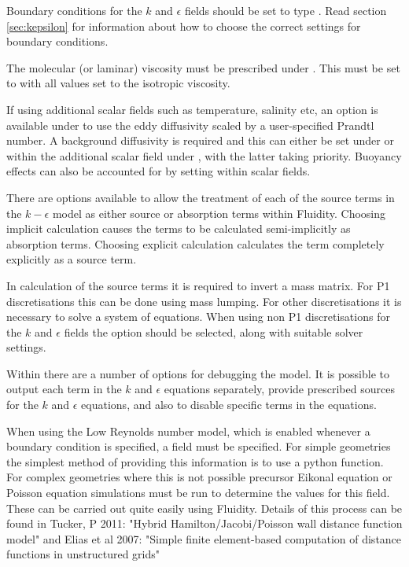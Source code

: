 Boundary conditions for the $k$ and $\epsilon$ fields should be set to type
. Read section \ref{sec:kepsilon} for information about how to choose
the correct settings for boundary conditions.

The molecular (or laminar) viscosity must be prescribed under
. This must be set to
 with all values set
to the isotropic viscosity.

If using additional scalar fields such as temperature, salinity etc, an option is
available under  to use the eddy
diffusivity scaled by a user-specified Prandtl number. A background diffusivity is
required and this can either be set under
 or within the additional
scalar field under
, with
the latter taking priority. Buoyancy effects can also be accounted for by setting
 within scalar
fields.

There are options available to allow the treatment of each of the source terms in the
$k-\epsilon$ model as either source or absorption terms within Fluidity. Choosing implicit
calculation causes the terms to be calculated semi-implicitly as absorption
terms. Choosing explicit calculation calculates the term completely explicitly as a source
term.

In calculation of the source terms it is required to invert a mass matrix. For P1
discretisations this can be done using mass lumping. For other discretisations it is
necessary to solve a system of equations. When using non P1 discretisations for the $k$
and $\epsilon$ fields the option
 should
be selected, along with suitable solver settings.

Within  there are a number of options for
debugging the model. It is possible to output each term in the $k$ and $\epsilon$
equations separately, provide prescribed sources for the $k$ and $\epsilon$ equations, and
also to disable specific terms in the equations.

When using the Low Reynolds number model, which is enabled whenever a
 boundary condition is specified, a  field
must be specified. For simple geometries the simplest method of providing this information
is to use a python function. For complex geometries where this is not possible precursor
Eikonal equation or Poisson equation simulations must be run to determine the values for
this field. These can be carried out quite easily using Fluidity. Details of this process
can be found in Tucker, P 2011: "Hybrid Hamilton/Jacobi/Poisson wall distance function
model" and Elias et al 2007: "Simple finite element-based computation of distance
functions in unstructured grids"

